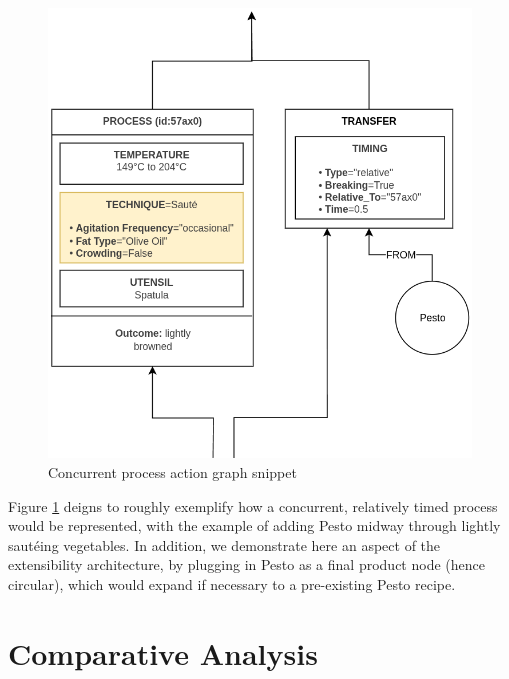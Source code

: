 \documentclass[sigconf]{acmart}
\begin{document}
\begin{figure}[h]
  \centering
  \includegraphics[width=\linewidth]{images/concurrency.png}
  \caption{Concurrent process action graph snippet}
  \label{fig:concurrent}
\end{figure}

Figure \ref{fig:concurrent} deigns to roughly exemplify how a concurrent, relatively timed process would be represented, with the example of adding Pesto midway through lightly sautéing vegetables. In addition, we demonstrate here an aspect of the extensibility architecture, by plugging in Pesto as a final product node (hence circular), which would expand if necessary to a pre-existing Pesto recipe.

\section{Comparative Analysis}
\end{document}

